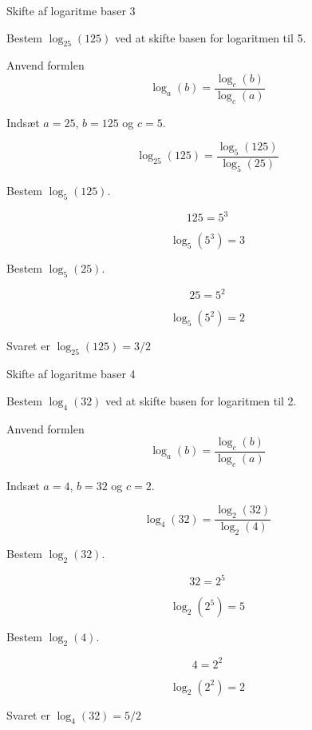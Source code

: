 \documentclass{article}
\begin{document}
\newpage
\begin{exercise}{Skifte af logaritme baser 3}
	
	Bestem $\log_{25}(125)$ ved at skifte basen for logaritmen til 5.
	
	
	\hint
	
	Anvend formlen 
	\[
	\log_a(b) = \frac{\log_c(b)}{\log_c(a)}
	\]
	
	\hint
	
	Indsæt $a=25$, $b=125$ og $c=5$.
	
	\hint
	\[
	\log_{25}(125) = \frac{\log_5(125)}{\log_5(25)}
	\]
	
	\hint
	Bestem $\log_5(125)$.
	
	\hint
	\[
	125  = 5^3	
	\]
	
	
	\hint
	\[
	\log_5(5^3) = 3
	\]
	
	\hint
	Bestem $\log_5(25)$.
	
	\hint
	\[
	25  = 5^2	
	\]
	
	\hint
	\[
	\log_5(5^2) = 2
	\]
	
	\hint
	Svaret er 	$\log_{25}(125) = 3/2$
	
	
\end{exercise}

\newpage
\begin{exercise}{Skifte af logaritme baser 4}
	
	Bestem $\log_{4}(32)$ ved at skifte basen for logaritmen til 2.
	
	
	\hint
	
	Anvend formlen 
	\[
	\log_a(b) = \frac{\log_c(b)}{\log_c(a)}
	\]
	
	\hint
	
	Indsæt $a=4$, $b=32$ og $c=2$.
	
	\hint
	\[
	\log_{4}(32) = \frac{\log_2(32)}{\log_2(4)}
	\]
	
	\hint
	Bestem $\log_2(32)$.
	
	\hint
	\[
	32  = 2^5	
	\]
	
	
	\hint
	\[
	\log_2(2^5) = 5
	\]
	
	\hint
	Bestem $\log_2(4)$.
	
	\hint
	\[
	4  = 2^2	
	\]
	
	\hint
	\[
	\log_2(2^2) = 2
	\]
	
	\hint
	Svaret er 	$\log_{4}(32) = 5/2$
	
	
\end{exercise}
\end{document}
